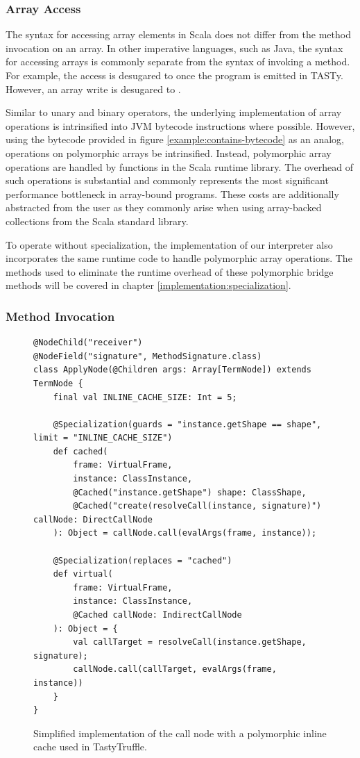 \subsubsection{Array Access}

The syntax for accessing array elements in Scala does not differ from the method invocation on an array.
In other imperative languages, such as Java, the syntax for accessing arrays is commonly separate from the syntax of invoking a method.
For example, the access  is desugared to  once the program is emitted in TASTy.
However, an array write  is desugared to .

Similar to unary and binary operators, the underlying implementation of array operations is intrinsified into JVM bytecode instructions where possible.
However, using the bytecode provided in figure \ref{example:contains-bytecode} as an analog, operations on polymorphic arrays  be intrinsified.
Instead, polymorphic array operations are handled by functions in the Scala runtime library.
The overhead of such operations is substantial and commonly represents the most significant performance bottleneck in array-bound programs.
These costs are additionally abstracted from the user as they commonly arise when using array-backed collections from the Scala standard library.

To operate without specialization, the implementation of our interpreter also incorporates the same runtime code to handle polymorphic array operations.
The methods used to eliminate the runtime overhead of these polymorphic bridge methods will be covered in chapter \ref{implementation:specialization}.

\subsubsection{Method Invocation}

\begin{figure}[!htb]
\begin{verbatim}
@NodeChild("receiver")
@NodeField("signature", MethodSignature.class)
class ApplyNode(@Children args: Array[TermNode]) extends TermNode {
	final val INLINE_CACHE_SIZE: Int = 5;
	
	@Specialization(guards = "instance.getShape == shape", limit = "INLINE_CACHE_SIZE")
	def cached(
		frame: VirtualFrame,
		instance: ClassInstance,
		@Cached("instance.getShape") shape: ClassShape,
		@Cached("create(resolveCall(instance, signature)") callNode: DirectCallNode
	): Object = callNode.call(evalArgs(frame, instance));
	
	@Specialization(replaces = "cached")
	def virtual(
		frame: VirtualFrame,
		instance: ClassInstance,
		@Cached callNode: IndirectCallNode
	): Object = {
		val callTarget = resolveCall(instance.getShape, signature);
		callNode.call(callTarget, evalArgs(frame, instance))
	}
}
\end{verbatim}
\caption{Simplified implementation of the call node with a polymorphic inline cache used in TastyTruffle.}
\label{implementation:poly-cache-call-node}
\end{figure}

